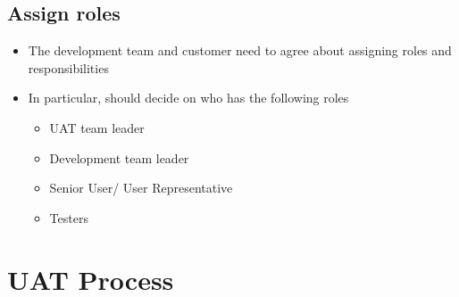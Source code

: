 \documentclass{article}[18pt]
\begin{document}
\subsection{Assign roles}
\begin{itemize}
	\item The development team and customer need to agree about assigning roles and responsibilities
	\item In particular, should decide on who has the following roles
	\begin{itemize}
		\item UAT team leader
		\item Development team leader
		\item Senior User/ User Representative
		\item Testers
	\end{itemize}
\end{itemize}
\section{UAT Process}
\end{document}
